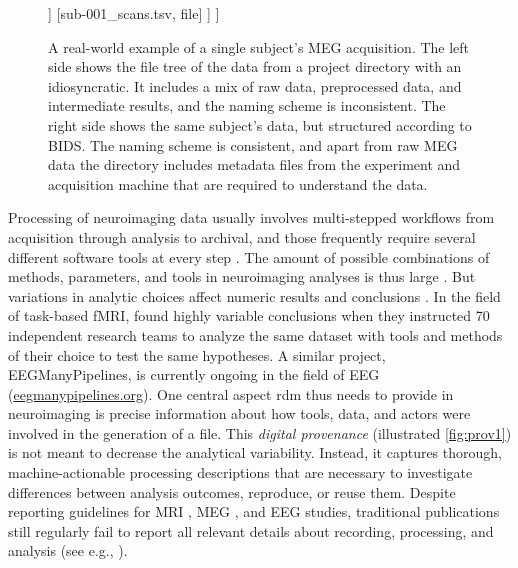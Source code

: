 \begin{figure}
{\begin{minipage}{.49\textwidth}
\begin{forest}
		]
		[sub-001\_scans.tsv, file]
		]
		]
	\end{forest}
\end{minipage}
}
\caption[An example of BIDS]{A real-world example of a single subject's MEG acquisition. The left side shows the file tree of the data from a project directory with an idiosyncratic. It includes a mix of raw data, preprocessed data, and intermediate results, and the naming scheme is inconsistent. The right side shows the same subject's data, but structured according to \gls{BIDS}. The naming scheme is consistent, and apart from raw MEG data the directory includes metadata files from the experiment and acquisition machine that are required to understand the data.}
\label{fig:BIDS}
\end{figure}

Processing of neuroimaging data usually involves multi-stepped workflows from acquisition through analysis to archival, and those frequently require several different software tools at every step \citep{poline2011}\citep{NISO2022119623}.
The amount of possible combinations of methods, parameters, and tools in neuroimaging analyses is thus large \citep{bowring2019exploring}.
But variations in analytic choices affect numeric results and conclusions \citep{silberzahn2018}.
In the field of task-based fMRI, \citet{botvinik2020variability} found highly variable conclusions when they instructed 70 independent research teams to analyze the same dataset with tools and methods of their choice to test the same hypotheses.
A similar project, EEGManyPipelines, is currently ongoing in the field of EEG (\href{https://eegmanypipelines.org/}{eegmanypipelines.org}).
One central aspect \gls{rdm} thus needs to provide in neuroimaging is precise information about how tools, data, and actors were involved in the generation of a file.
This \textit{digital provenance}  (illustrated \cref{fig:prov1}) is not meant to decrease the analytical variability.
Instead, it captures thorough, machine-actionable processing descriptions that are necessary to investigate differences between analysis outcomes, reproduce, or reuse them.
Despite reporting guidelines for MRI \citep{nichols2017best}, MEG \citep{pernet2020issues}, and EEG \citep{styles2021towards} studies, traditional publications still regularly fail to report all relevant details about recording, processing, and analysis (see e.g., \citet{vsovskic2022better}).

